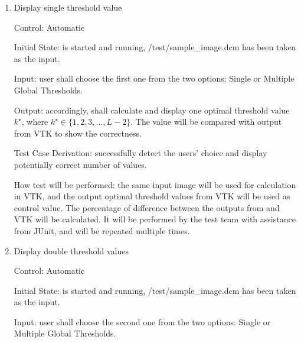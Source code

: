 \documentclass[12pt, titlepage]{article}
\begin{document}
\begin{enumerate}

\item{Display single threshold value}

Control: Automatic
					
Initial State: \progname{} is started and running, /test/sample\_image.dcm has
been taken as the input. 

Input: user shall choose the first one from the two options: Single or Multiple
Global Thresholds.
					
Output: accordingly, \progname{} shall calculate and display one optimal
threshold value $k^{\star}$, where $k^{\star} \in \{1, 2, 3, ..., L-2\}$. The
value will be compared with output from VTK to show the correctness.

Test Case Derivation: successfully detect the users' choice and display
potentially correct number of values.

How test will be performed: the same input image will be used for calculation
in VTK, and the output optimal threshold values from VTK will be used as control
value. The percentage of difference between the outputs from \progname{} and
VTK will be calculated. It will be performed by the test team with assistance
from
JUnit, and will be repeated multiple times.

\item{Display double threshold values}

Control: Automatic
					
Initial State: \progname{} is started and running, /test/sample\_image.dcm has
been taken as the input.
					
Input: user shall choose the second one from the two options: Single or
Multiple Global Thresholds.
					

\end{enumerate}
\end{document}
